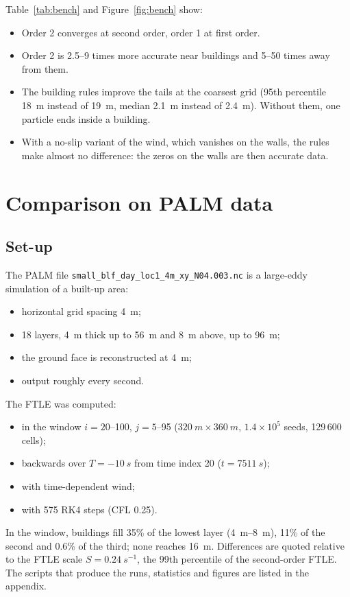 \documentclass[11pt,a4paper]{article}
\begin{document}
Table~\ref{tab:bench} and Figure~\ref{fig:bench} show:
\begin{itemize}
  \item Order 2 converges at second order, order 1 at first order.
  \item Order 2 is 2.5--9 times more accurate near buildings and 5--50 times
        away from them.
  \item The building rules improve the tails at the coarsest grid (95th
        percentile \SI{18}{m} instead of \SI{19}{m}, median \SI{2.1}{m} instead
        of \SI{2.4}{m}). Without them, one particle ends inside a building.
  \item With a no-slip variant of the wind, which vanishes on the walls, the
        rules make almost no difference: the zeros on the walls are then
        accurate data.
\end{itemize}

\section{Comparison on PALM data}

\subsection{Set-up}

The PALM file \texttt{small\_blf\_day\_loc1\_4m\_xy\_N04.003.nc} is a large-eddy
simulation of a built-up area:
\begin{itemize}
  \item horizontal grid spacing \SI{4}{m};
  \item 18 layers, \SI{4}{m} thick up to \SI{56}{m} and \SI{8}{m} above, up to
        \SI{96}{m};
  \item the ground face is reconstructed at \SI{4}{m};
  \item output roughly every second.
\end{itemize}
The FTLE was computed:
\begin{itemize}
  \item in the window $i=20$--100, $j=5$--95 ($\SI{320}{m}\times\SI{360}{m}$,
        $1.4\times10^5$ seeds, 129\,600 cells);
  \item backwards over $T=\SI{-10}{s}$ from time index 20 ($t=\SI{7511}{s}$);
  \item with time-dependent wind;
  \item with 575 RK4 steps (CFL 0.25).
\end{itemize}
In the window, buildings fill 35\% of the lowest layer (\SIrange{4}{8}{m}), 11\%
of the second and 0.6\% of the third; none reaches \SI{16}{m}. Differences are
quoted relative to the FTLE scale $S=\SI{0.24}{s^{-1}}$, the 99th percentile of
the second-order FTLE. The scripts that produce the runs, statistics and
figures are listed in the appendix.
\end{document}
